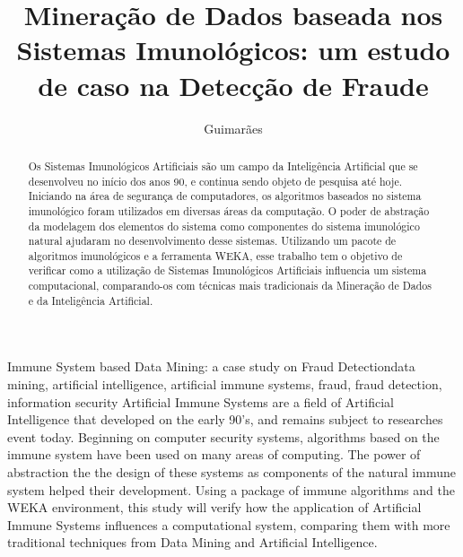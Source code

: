 \documentclass{iiufrgs}
\title{Mineração de Dados baseada nos Sistemas Imunológicos: um estudo de caso na Detecção de Fraude}
\author{Guimarães}{Bruno Barcarol}
\begin{document}
\maketitle

\tableofcontents

\listoffigures

\listoftables

\lstlistoflistings

\printnomenclature

\begin{abstract}
    Os Sistemas Imunológicos Artificiais são um campo da Inteligência Artificial que se desenvolveu no início dos anos 90, e continua sendo objeto de pesquisa até hoje. Iniciando na área de segurança de computadores, os algoritmos baseados no sistema imunológico foram utilizados em diversas áreas da computação. O poder de abstração da modelagem dos elementos do sistema como componentes do sistema imunológico natural ajudaram no desenvolvimento desse sistemas. Utilizando um pacote de algoritmos imunológicos e a ferramenta WEKA, esse trabalho tem o objetivo de verificar como a utilização de Sistemas Imunológicos Artificiais influencia um sistema computacional, comparando-os com técnicas mais tradicionais da Mineração de Dados e da Inteligência Artificial.
\end{abstract}

\begin{englishabstract}{Immune System based Data Mining: a case study on Fraud Detection}{data mining, artificial intelligence, artificial immune systems, fraud, fraud detection, information security}
    Artificial Immune Systems are a field of Artificial Intelligence that developed on the early 90's, and remains subject to researches event today. Beginning on computer security systems, algorithms based on the immune system have been used on many areas of computing. The power of abstraction the the design of these systems as components of the natural immune system helped their development. Using a package of immune algorithms and the WEKA environment, this study will verify how the application of Artificial Immune Systems influences a computational system, comparing them with more traditional techniques from Data Mining and Artificial Intelligence.
\end{englishabstract}












\end{document}
